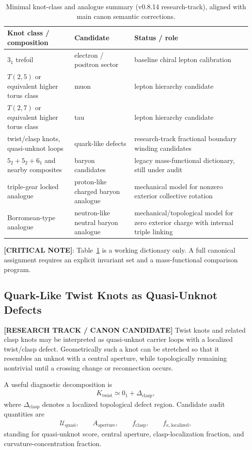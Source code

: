 \begin{table}[h]
\centering
\begin{tabular}{lll}
\hline
Knot class / composition & Candidate & Status / role \\
\hline
$3_1$ trefoil & electron / positron sector & baseline chiral lepton calibration \\
$T(2,5)$ or equivalent higher torus class & muon & lepton hierarchy candidate \\
$T(2,7)$ or equivalent higher torus class & tau & lepton hierarchy candidate \\
twist/clasp knots, quasi-unknot loops & quark-like defects & research-track fractional boundary winding candidates \\
$5_2+5_2+6_1$ and nearby composites & baryon candidates & legacy mass-functional dictionary, still under audit \\
triple-gear locked analogue & proton-like charged baryon analogue & mechanical model for nonzero exterior collective rotation \\
Borromean-type analogue & neutron-like neutral baryon analogue & mechanical/topological model for zero exterior charge with internal triple linking \\
\hline
\end{tabular}
\caption{Minimal knot-class and analogue summary (v0.8.14 research-track), aligned with main canon semantic corrections.}
\label{tab:particle-candidates}
\end{table}

\textbf{[CRITICAL NOTE]}: Table~\ref{tab:particle-candidates} is a working dictionary only. A full canonical assignment requires an explicit invariant set and a mass-functional comparison program.


\subsection{Quark-Like Twist Knots as Quasi-Unknot Defects}
\label{subsec:rt_quark_twist_quasi_unknot}

\textbf{[RESEARCH TRACK / CANON CANDIDATE]} Twist knots and related clasp knots may be interpreted as quasi-unknot carrier loops with a localized twist/clasp defect. Geometrically such a knot can be stretched so that it resembles an unknot with a central aperture, while topologically remaining nontrivial until a crossing change or reconnection occurs.

A useful diagnostic decomposition is
\begin{align}
    K_{\mathrm{twist}}
    \simeq
    0_1 + \Delta_{\mathrm{clasp}},
\end{align}
where $\Delta_{\mathrm{clasp}}$ denotes a localized topological defect region. Candidate audit quantities are
\begin{align}
    \mathcal{U}_{\mathrm{quasi}},\qquad
    A_{\mathrm{aperture}},\qquad
    f_{\mathrm{clasp}},\qquad
    f_{\kappa,\mathrm{localized}},
\end{align}
standing for quasi-unknot score, central aperture, clasp-localization fraction, and curvature-concentration fraction.


